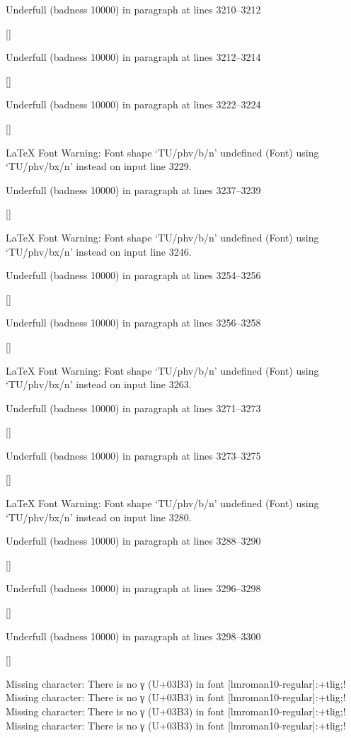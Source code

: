 Underfull \hbox (badness 10000) in paragraph at lines 3210--3212

 []


Underfull \hbox (badness 10000) in paragraph at lines 3212--3214

 []


Underfull \hbox (badness 10000) in paragraph at lines 3222--3224

 []


LaTeX Font Warning: Font shape `TU/phv/b/n' undefined
(Font)              using `TU/phv/bx/n' instead on input line 3229.


Underfull \hbox (badness 10000) in paragraph at lines 3237--3239

 []


LaTeX Font Warning: Font shape `TU/phv/b/n' undefined
(Font)              using `TU/phv/bx/n' instead on input line 3246.


Underfull \hbox (badness 10000) in paragraph at lines 3254--3256

 []


Underfull \hbox (badness 10000) in paragraph at lines 3256--3258

 []


LaTeX Font Warning: Font shape `TU/phv/b/n' undefined
(Font)              using `TU/phv/bx/n' instead on input line 3263.


Underfull \hbox (badness 10000) in paragraph at lines 3271--3273

 []


Underfull \hbox (badness 10000) in paragraph at lines 3273--3275

 []


LaTeX Font Warning: Font shape `TU/phv/b/n' undefined
(Font)              using `TU/phv/bx/n' instead on input line 3280.


Underfull \hbox (badness 10000) in paragraph at lines 3288--3290

 []


Underfull \hbox (badness 10000) in paragraph at lines 3296--3298

 []


Underfull \hbox (badness 10000) in paragraph at lines 3298--3300

 []

Missing character: There is no γ (U+03B3) in font [lmroman10-regular]:+tlig;!
Missing character: There is no γ (U+03B3) in font [lmroman10-regular]:+tlig;!
Missing character: There is no γ (U+03B3) in font [lmroman10-regular]:+tlig;!
Missing character: There is no γ (U+03B3) in font [lmroman10-regular]:+tlig;!

